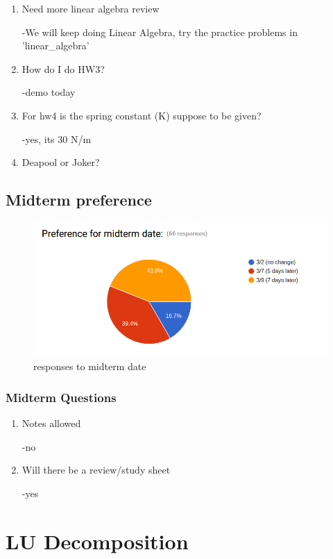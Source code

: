\documentclass[11pt]{article}
\makeatletter
\def\maxwidth{\ifdim\Gin@nat@width>\linewidth\linewidth
    \else\Gin@nat@width\fi}
\let\Oldincludegraphics\includegraphics
\renewcommand{\includegraphics}[1]{\Oldincludegraphics[width=.8\maxwidth]{#1}}
\makeatother
\begin{document}
\begin{enumerate}
\def\labelenumi{\arabic{enumi}.}
\item
  Need more linear algebra review

  -We will keep doing Linear Algebra, try the practice problems in
  'linear\_algebra'
\item
  How do I do HW3?

  -demo today
\item
  For hw4 is the spring constant (K) suppose to be given?

  -yes, its 30 N/m
\item
  Deapool or Joker?
\end{enumerate}

\subsection{Midterm preference}\label{midterm-preference}

\begin{figure}[htbp]
\centering
\includegraphics{midterm_date.png}
\caption{responses to midterm date}
\end{figure}

\subsubsection{Midterm Questions}\label{midterm-questions}

\begin{enumerate}
\def\labelenumi{\arabic{enumi}.}
\item
  Notes allowed

  -no
\item
  Will there be a review/study sheet

  -yes
\end{enumerate}

    \section{LU Decomposition}\label{lu-decomposition}
\end{document}
